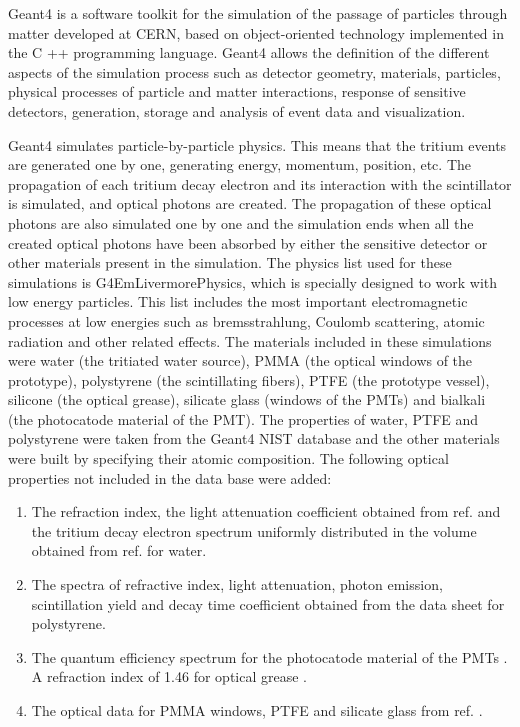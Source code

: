 Geant4 is a software toolkit for the simulation of the passage of particles through matter developed at CERN, based on object-oriented technology implemented in the C ++ programming language. Geant4 allows the definition of the different aspects of the simulation process such as detector geometry, materials, particles, physical processes of particle and matter interactions, response of sensitive detectors, generation, storage and analysis of event data and visualization.

Geant4 simulates particle-by-particle physics. This means that the tritium events are generated one by one, generating energy, momentum, position, etc. The propagation of each tritium decay electron and its interaction  with the scintillator is simulated, and optical photons are created. The propagation of these optical photons are also simulated one by one and the simulation ends when all the created optical photons have been absorbed by either the sensitive detector or other materials present in the simulation. The physics list used for these simulations is G4EmLivermorePhysics, which is specially designed to work with low energy particles. This list includes the most important electromagnetic processes at low energies such as bremsstrahlung, Coulomb scattering, atomic radiation and other related effects. The materials included in these simulations were water (the tritiated water source), PMMA (the optical windows of the prototype), polystyrene (the scintillating fibers), PTFE (the prototype vessel), silicone (the optical grease), silicate glass (windows of the PMTs) and bialkali (the photocatode material of the PMT). The properties of water, PTFE and polystyrene were taken from the Geant4 NIST database and the other materials were built by specifying their atomic composition. The following optical properties not included in the data base were added:

\begin{enumerate}
%
\item{} The refraction index, the light attenuation coefficient obtained from ref. \cite{WaterPropertiesSimulation} and the tritium decay electron spectrum uniformly distributed in the volume obtained from ref. \cite{TritiumEmissionSpectrum} for water. 

\item{} The spectra of refractive index, light attenuation, photon emission, scintillation yield and decay time coefficient obtained from the data sheet \cite{DataSheetBCF12Fiber} for polystyrene.

\item{} The quantum efficiency spectrum for the photocatode material of the PMTs \cite{DataSheetPMTs}. A refraction index of 1.46 for optical grease \cite{OpticalGrease}.

\item{} The optical data for PMMA windows, PTFE and silicate glass from ref. \cite{NEMODataSimulation}.

\end{enumerate} 